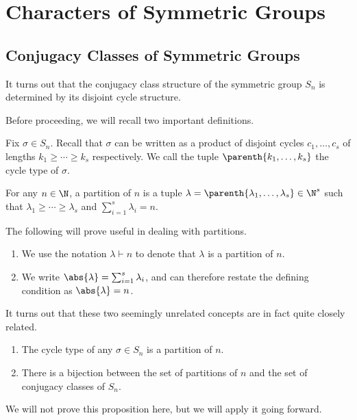 \section{Characters of Symmetric Groups}

\subsection{Conjugacy Classes of Symmetric Groups}

It turns out that the conjugacy class structure of the symmetric group $S_n$ is determined by its disjoint cycle structure.

Before proceeding, we will recall two important definitions.

\begin{definition}
    Fix $\sigma \in S_n$. Recall that $\sigma$ can be written as a product of disjoint cycles $c_1, \ldots, c_s$ of lengths $k_1 \geq \cdots \geq k_s$ respectively. We call the tuple $\parenth{k_1, \ldots, k_s}$ the cycle type of $\sigma$.
\end{definition}

\begin{definition}[Partition]
    For any $n \in \N$, a partition of $n$ is a tuple $\lambda = \parenth{\lambda_1, \ldots, \lambda_s} \in \N^s$ such that $\lambda_1 \geq \cdots \geq \lambda_s$ and $\sum_{i=1}^s \lambda_i = n$.
\end{definition}
\begin{boxnotation}
    The following will prove useful in dealing with partitions.
    \begin{enumerate}[label = (\roman*), noitemsep]
        \item We use the notation $\lambda \vdash n$ to denote that $\lambda$ is a partition of $n$.
        \item We write $\abs{\lambda} = \sum_{i=1}^{s} \lambda_i$, and can therefore restate the defining condition as $\abs{\lambda} = n$.
    \end{enumerate}
\end{boxnotation}

It turns out that these two seemingly unrelated concepts are in fact quite closely related.

\begin{proposition}
    \hfill
    \begin{enumerate}[noitemsep, label = \normalfont \arabic*.]
        \item The cycle type of any $\sigma \in S_n$ is a partition of $n$.
        \item There is a bijection between the set of partitions of $n$ and the set of conjugacy classes of $S_n$.
    \end{enumerate}
\end{proposition}
We will not prove this proposition here, but we will apply it going forward.

